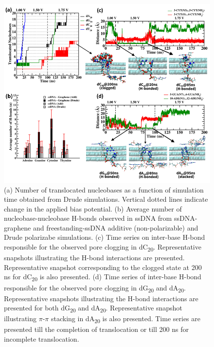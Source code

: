 \begin{figure}
    \centering
    \includegraphics[width=\textwidth]{Chapter4/Figures/Figure4.png}
    \caption[DNA translocation through nanopores in a three-layer graphene membrane in Drude polarizable FF]{(a) Number of translocated nucleobases as a function of simulation time obtained from Drude simulations. Vertical dotted lines indicate change in the applied bias potential. (b) Average number of nucleobase-nucleobase H-bonds observed in ssDNA from ssDNA-graphene and freestanding-ssDNA additive (non-polarizable) and Drude polarizabe simulations. (c) Time series on inter-base H-bond responsible for the observed pore clogging in dC\textsubscript{20}. Representative snapshots illustrating the H-bond interactions are presented. Representative snapshot corresponding to the clogged state at 200 ns for dC\textsubscript{20} is also presented. (d) Time series of inter-base H-bond responsible for the observed pore clogging in dG\textsubscript{20} and dA\textsubscript{20}. Representative snapshots illustrating the H-bond interactions are presented for both dG\textsubscript{20} and dA\textsubscript{20}. Representative snapshot illustrating $\pi$-$\pi$ stacking in dA\textsubscript{20} is also presented. Time series are presented till the completion of translocation or till 200 ns for incomplete translocation.}
\end{figure}

